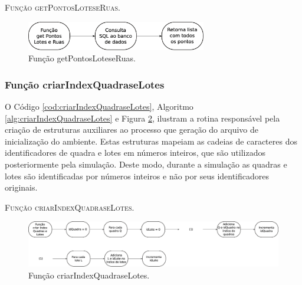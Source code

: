 

\begin{algorithm}[H]
   \SetAlgoLined   
   
   \caption{\textsc{Função getPontosLoteseRuas.}}
   \label{alg:getPontosLoteseRuas}
\end{algorithm}

\begin{figure}[H]
  \centering
  \includegraphics[width=0.7\textwidth]{Figuras/Simula/Fluxos/getPontosLoteseRuas.eps}
  \caption{Função getPontosLoteseRuas.}
  \label{fig:getPontosLoteseRuas}
\end{figure} 

\newpage

\subsubsection{Função criarIndexQuadraseLotes}

O Código \ref{cod:criarIndexQuadraseLotes}, Algoritmo \ref{alg:criarIndexQuadraseLotes} e Figura \ref{fig:criarIndexQuadraseLotes}, ilustram a rotina responsável pela criação de estruturas auxiliares ao processo que geração do arquivo de inicialização do ambiente. Estas estruturas mapeiam as cadeias de caracteres dos identificadores de quadra e lotes em números inteiros, que são utilizados posteriormente pela simulação. Deste modo, durante a simulação as quadras e lotes são identificadas por números inteiros e não por seus identificadores originais. 



\begin{algorithm}[H]
   \SetAlgoLined   
   
   \caption{\textsc{Função criarIndexQuadraseLotes.}}
   \label{alg:criarIndexQuadraseLotes}
\end{algorithm}

\begin{figure}[H]
  \centering
  \includegraphics[width=1\textwidth]{Figuras/Simula/Fluxos/criarIndexQuadraseLotes.eps}
  \caption{Função criarIndexQuadraseLotes.}
  \label{fig:criarIndexQuadraseLotes}
\end{figure} 

